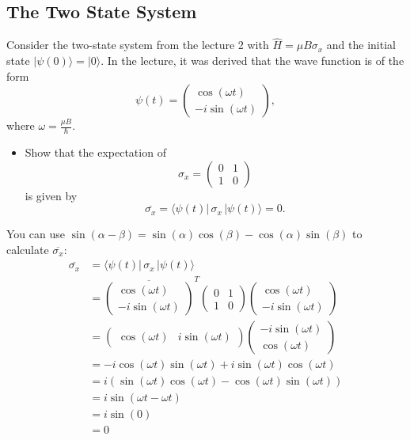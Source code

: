 \documentclass{article}
\begin{document}
  \subsection{The Two State System}
  \begin{centerframebox}
    Consider the two-state system from the lecture 2 with $\hat{H} = \mu B \sigma_x$ and the initial state $|\psi(0)\rangle = |0\rangle$.
    In the lecture, it was derived that the wave function is of the form
    \[ \psi(t) = \begin{pmatrix}
      \cos(\omega t) \\
      -i\sin(\omega t)
    \end{pmatrix}, \]
    where $\omega={\frac{\mu B}{\hbar}}$.

    \begin{itemize}
      \item Show that the expectation of
      \[ \sigma_x = \begin{pmatrix}
        0 & 1 \\
        1 & 0
      \end{pmatrix} \]
      is given by
      \[\overline{\sigma_{x}} = \langle\psi(t)|\,\sigma_{x}\,|\psi(t)\rangle = 0.\]
    \end{itemize}
  \end{centerframebox}
  You can use $\sin(\alpha - \beta) = \sin(\alpha)\cos(\beta) - \cos(\alpha)\sin(\beta)$ to calculate $\overline{\sigma_x}$:
  \begin{align*}
      \overline{\sigma_{x}} &= \langle\psi(t)|\,\sigma_{x}\,|\psi(t)\rangle\\
      &= \overline{\begin{pmatrix}\cos(\omega t)\\-i\sin(\omega t)\end{pmatrix}}^T\begin{pmatrix}0&1\\1&0\end{pmatrix}\begin{pmatrix}\cos(\omega t)\\-i\sin(\omega t)\end{pmatrix}\\
      &= \begin{pmatrix}\cos(\omega t)&i\sin(\omega t)\end{pmatrix}\begin{pmatrix}-i\sin(\omega t)\\\cos(\omega t)\end{pmatrix}\\
      &= -i\cos(\omega t)\sin(\omega t) + i\sin(\omega t)\cos(\omega t)\\
      &= i(\sin(\omega t)\cos(\omega t) - \cos(\omega t)\sin(\omega t))\\
      &= i\sin(\omega t - \omega t)\\
      &= i\sin(0)\\
      &= 0
  \end{align*}
\end{document}

